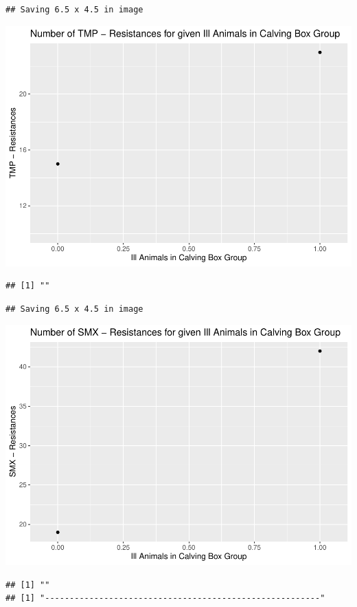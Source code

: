 \documentclass[
]{article}
\begin{document}
\begin{verbatim}
## Saving 6.5 x 4.5 in image
\end{verbatim}

\includegraphics{NResistenzen_files/figure-latex/binary_or_nominal_variables-29.pdf}

\begin{verbatim}
## [1] ""
\end{verbatim}

\begin{verbatim}
## Saving 6.5 x 4.5 in image
\end{verbatim}

\includegraphics{NResistenzen_files/figure-latex/binary_or_nominal_variables-30.pdf}

\begin{verbatim}
## [1] ""
## [1] "--------------------------------------------------------"
\end{verbatim}
\end{document}
